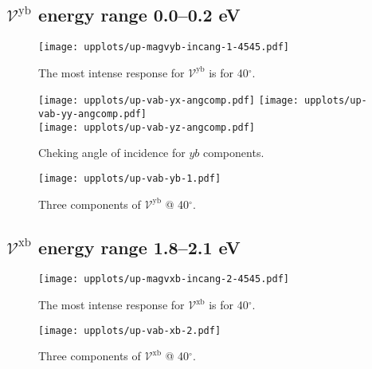 \documentclass{article}
\let\Oldsubsection\subsection
\renewcommand{\subsection}{\FloatBarrier\Oldsubsection}
\begin{document}

\subsection{$\mathcal{V}^{\mathrm{yb}}$ energy range 0.0--0.2 eV }
\begin{figure}[h]
    \centering
    \texttt{[image: upplots/up-magvyb-incang-1-4545.pdf]}
    \caption{The most intense response for $\mathcal{V}^{\mathrm{yb}} $ is for 
    40$^{\circ}$.}
    \label{fig:up-magvybincang1}
\end{figure}
\begin{figure}[ht]
    \centering
    \texttt{[image: upplots/up-vab-yx-angcomp.pdf]}
    \texttt{[image: upplots/up-vab-yy-angcomp.pdf]}\\
    \texttt{[image: upplots/up-vab-yz-angcomp.pdf]}
    \caption{Cheking angle of incidence for $yb$ components.}
    \label{fig:up-ybangcomp}
\end{figure}
\begin{figure}[ht]
    \centering
    \texttt{[image: upplots/up-vab-yb-1.pdf]}
    \caption{Three components of $\mathcal{V}^{\mathrm{yb}} $ @ 40$^{\circ}$.}
    \label{fig:up-vyb1}
\end{figure}



\subsection{$\mathcal{V}^{\mathrm{xb}}$ energy range 1.8--2.1 eV }


\begin{figure}[h]
    \centering
    \texttt{[image: upplots/up-magvxb-incang-2-4545.pdf]}
    \caption{The most intense response for $\mathcal{V}^{\mathrm{xb}} $ is for 
    40$^{\circ}$.}
    \label{fig:up-magxbincang2}
\end{figure}
\begin{figure}[h]
    \centering
    \texttt{[image: upplots/up-vab-xb-2.pdf]}
    \caption{Three components of $\mathcal{V}^{\mathrm{xb}} $ @ 40$^{\circ}$.}
    \label{fig:up-vxb2}
\end{figure}
\end{document}

